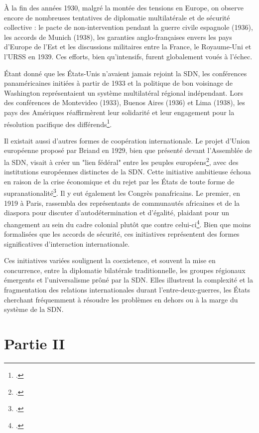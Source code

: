 \documentclass[a4paper,twoside,12pt]{book}
\begin{document}
À la fin des années 1930, malgré la montée des tensions en Europe, on observe encore de nombreuses tentatives de diplomatie multilatérale et de sécurité collective : le pacte de non-intervention pendant la guerre civile espagnole (1936), les accords de Munich (1938), les garanties anglo-françaises envers les pays d'Europe de l'Est et les discussions militaires entre la France, le Royaume-Uni et l'URSS en 1939. Ces efforts, bien qu'intensifs, furent globalement voués à l'échec.

Étant donné que les États-Unis n'avaient jamais rejoint la SDN, les conférences panaméricaines initiées à partir de 1933 et la politique de bon voisinage de Washington représentaient un système multilatéral régional indépendant. Lors des conférences de Montevideo (1933), Buenos Aires (1936) et Lima (1938), les pays des Amériques réaffirmèrent leur solidarité et leur engagement pour la résolution pacifique des différends\footcite[p.220-221]{milza2019}.

Il existait aussi d'autres formes de coopération internationale. Le projet d'Union européenne proposé par Briand en 1929, bien que présenté devant l'Assemblée de la SDN, visait à créer un "lien fédéral" entre les peuples européens\footcite[p.465-466]{guieu2016}, avec des institutions européennes distinctes de la SDN. Cette initiative ambitieuse échoua en raison de la crise économique et du rejet par les États de toute forme de supranationalité\footcite[p.131]{milza2019}. Il y eut également les Congrès panafricains. Le premier, en 1919 à Paris, rassembla des représentants de communautés africaines et de la diaspora pour discuter d'autodétermination et d'égalité, plaidant pour un changement au sein du cadre colonial plutôt que contre celui-ci\footcite[p.303-304]{guieu2016}. Bien que moins formalisées que les accords de sécurité, ces initiatives représentent des formes significatives d'interaction internationale.

Ces initiatives variées soulignent la coexistence, et souvent la mise en concurrence, entre la diplomatie bilatérale traditionnelle, les groupes régionaux émergents et l'universalisme prôné par la SDN. Elles illustrent la complexité et la fragmentation des relations internationales durant l'entre-deux-guerres, les États cherchant fréquemment à résoudre les problèmes en dehors ou à la marge du système de la SDN.

\chapter{Partie II}
\end{document}
